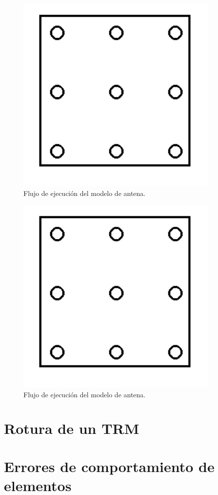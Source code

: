 \begin{figure}
 \centering
 \includegraphics[width=10cm]{gfx/panelBase.png}
 \caption{Flujo de ejecuci\'on del modelo de antena.}
\end{figure}

\begin{figure}
 \centering
 \includegraphics[width=10cm]{gfx/panelBase.png}
 \caption{Flujo de ejecuci\'on del modelo de antena.}
\end{figure}



\section{Rotura de un TRM}
\section{Errores de comportamiento de elementos}

